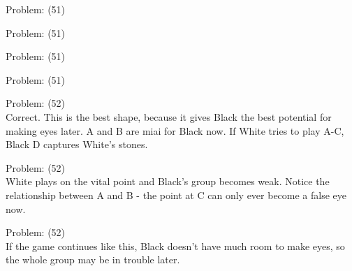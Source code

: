 \documentclass[11pt]{article}
\begin{document}
\begin{minipage}[t]{0.5\textwidth}
  {\centering
  
  Problem: (51)\\
  
  }
\end{minipage}
\begin{minipage}[t]{0.5\textwidth}
  {\centering
  
  Problem: (51)\\
  
  }
\end{minipage}
\begin{minipage}[t]{0.5\textwidth}
  {\centering
  
  Problem: (51)\\
  
  }
\end{minipage}
\begin{minipage}[t]{0.5\textwidth}
  {\centering
  
  Problem: (51)\\
  
  }
\end{minipage}
\begin{minipage}[t]{0.5\textwidth}
  {\centering
  
  Problem: (52)\\
  Correct. This is the best shape, because it gives Black the best potential for making eyes later. A and B are miai for Black now. If White tries to play A-C, Black D captures White's stones.\\
  }
\end{minipage}
\begin{minipage}[t]{0.5\textwidth}
  {\centering
  
  Problem: (52)\\
  White plays on the vital point and Black's group becomes weak. Notice the relationship between A and B - the point at C can only ever become a false eye now.\\
  }
\end{minipage}
\begin{minipage}[t]{0.5\textwidth}
  {\centering
  
  Problem: (52)\\
  If the game continues like this, Black doesn't have much room to make eyes, so the whole group may be in trouble later.\\
  }
\end{minipage}
\end{document}

